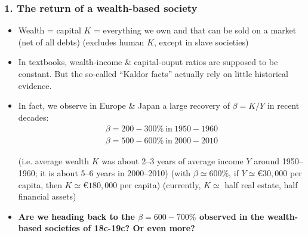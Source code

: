 \begin{frame}[label=WealthReturn,shrink=8]
\frametitle{1. The return of a wealth-based society}
\begin{itemize}
\item
Wealth = capital $K$ = everything we own and that can be sold on a market (net of all debts) (excludes human $K$, except in slave societies)
\item
In textbooks, wealth-income \& capital-ouput ratios are supposed to be constant. But the so-called ``Kaldor facts'' actually rely on little historical evidence.
\item
In fact, we observe in Europe \& Japan a large recovery of $\beta=K/Y$ in recent decades:
\begin{align*}
\beta = 200-300\% ~\text{in}~ 1950-1960 \\
\beta = 500-600\% ~\text{in}~ 2000-2010
\end{align*}
\begin{footnotesize}
(i.e. average wealth $K$ was about 2--3 years of average income $Y$ around 1950--1960; it is about 5--6 years in 2000--2010)
\linebreak
(with $\beta \simeq 600\%$, if $Y \simeq \euro 30,000$ per capita, then $K \simeq \euro 180,000$ per capita) (currently, $K \simeq$ half real estate, half financial assets)
\end{footnotesize}
\item
\textbf{Are we heading back to the $\beta = 600-700\%$ observed in the wealth-based societies of 18c-19c? Or even more?}
\end{itemize}
\end{frame}



